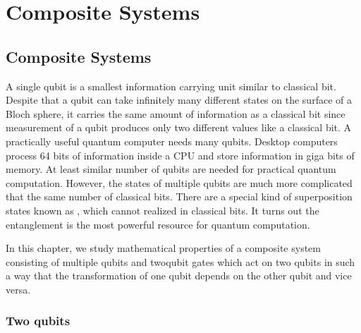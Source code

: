 \documentclass[letterpaper,10pt,english]{jupyterBook}
\begin{document}
\part{Composite Systems}

\sphinxstepscope


\chapter{Composite Systems}
\label{\detokenize{composites/intro:composite-systems}}\label{\detokenize{composites/intro:ch-composites}}\label{\detokenize{composites/intro::doc}}
\sphinxAtStartPar
A single qubit is a smallest information carrying unit similar to classical bit.  Despite that a qubit can take infinitely many different states on the surface of a Bloch sphere, it carries the same amount of information as a classical bit since measurement of a qubit produces only two different values like a classical bit.  A practically useful quantum computer needs many qubits. Desktop computers process 64 bits of information inside a CPU and store information in giga bits of memory. At least similar number of qubits are needed for practical quantum computation.  However, the states of multiple qubits are much more complicated that the same number of classical bits. There are a special kind of superposition states known as , which cannot realized in classical bits.  It turns out the entanglement is the most powerful resource for quantum computation.

\sphinxAtStartPar
In this chapter, we study mathematical properties of a composite system consisting of multiple qubits and two\sphinxhyphen{}qubit gates which act on two qubits in such a way that the transformation of one qubit  depends on the other qubit and vice versa.

\sphinxstepscope


\section{Two qubits}
\label{\detokenize{composites/2qubit:two-qubits}}\label{\detokenize{composites/2qubit:sec-2qubits}}\label{\detokenize{composites/2qubit::doc}}
\end{document}
